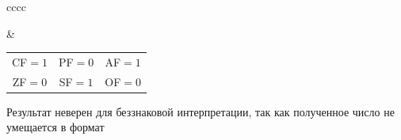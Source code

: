 \documentclass[12pt,a4paper]{report}
\begin{document}
\begin{tabular}{cccc}
 &
    \begin{tabular}{ccc}
    CF$=1$ & PF$=0$ & AF$=1$\\
    ZF$=0$ & SF$=1$ & OF$=0$
    \end{tabular}
\end{tabular}
\hfill\break
Результат неверен для беззнаковой интерпретации, так как полученное число не умещается в формат\\
\hfill\break
\end{document}
